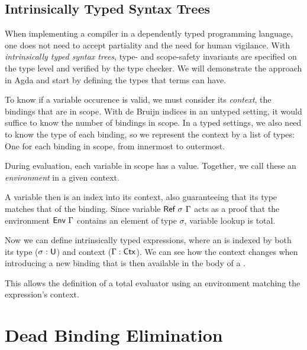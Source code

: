 \documentclass[11pt,a4paper]{article}
\begin{document}
\subsection{Intrinsically Typed Syntax Trees}

When implementing a compiler in a dependently typed programming language,
one does not need to accept partiality and the need for human vigilance.
With \emph{intrinsically typed syntax trees}, type- and scope-safety invariants
are specified on the type level and verified by the type checker.
We will demonstrate the approach in Agda and start by defining the types that terms can have.

\CodeLangTypes

To know if a variable occurence is valid, we must consider its \emph{context},
the bindings that are in scope.
With de Bruijn indices in an untyped setting, it would suffice to know the number of bindings in scope.
In a typed settings, we also need to know the type of each binding,
so we represent the context by a list of types: One for each binding in scope, from innermost to outermost.

\CodeLangCtx

During evaluation, each variable in scope has a value.
Together, we call these an \emph{environment} in a given context.

\CodeLangEnv

A variable then is an index into its context,
also guaranteeing that its type matches that of the binding.
Since variable $\AgdaDatatype{Ref}\ \sigma\ \Gamma$ acts as a proof that
the environment $\AgdaDatatype{Env}\ \Gamma$ contains an element of type $\sigma$,
variable lookup is total.

\CodeLangRef

Now we can define intrinsically typed expressions,
where an  is indexed by both
its type ($\sigma : \AgdaDatatype{U}$)
and context ($\Gamma : \AgdaDatatype{Ctx}$).
We can see how the context changes when introducing a new binding
that is then available in the body of a .

\CodeLangExpr

This allows the definition of a total evaluator
using an environment matching the expression's context.

\CodeLangSemantics


\section{Dead Binding Elimination}
\end{document}
